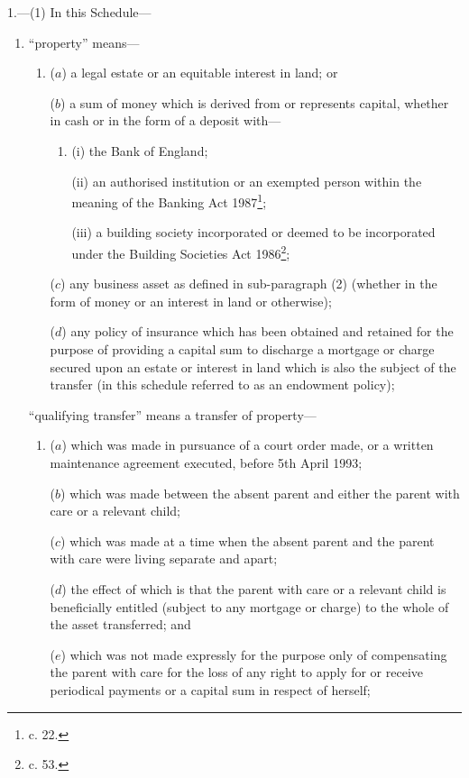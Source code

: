 \documentclass[12pt,a4paper]{article}
\begin{document}
1.—(1) In this Schedule—
\begin{enumerate}\item[]
“property” means—
\begin{enumerate}\item[]
($a$) a legal estate or an equitable interest in land; or

($b$) a sum of money which is derived from or represents capital, whether in cash or in the form of a deposit with—
\begin{enumerate}\item[]
(i) the Bank of England;

(ii) an authorised institution or an exempted person within the meaning of the Banking Act 1987\footnote{ c. 22.};

(iii) a building society incorporated or deemed to be incorporated under the Building Societies Act 1986\footnote{ c. 53.};
\end{enumerate}

\begin{sloppypar}
($c$) any business asset as defined in sub-paragraph (2) (whether in the form of money or an interest in land or otherwise);
\end{sloppypar}

($d$) any policy of insurance which has been obtained and retained for the purpose of providing a capital sum to discharge a mortgage or charge secured upon an estate or interest in land which is also the subject of the transfer (in this schedule referred to as an endowment policy);
\end{enumerate}

“qualifying transfer” means a transfer of property—
\begin{enumerate}\item[]
($a$) which was made in pursuance of a court order made, or a written maintenance agreement executed, before 5th April 1993;

($b$) which was made between the absent parent and either the parent with care or a relevant child;

($c$) which was made at a time when the absent parent and the parent with care were living separate and apart;

($d$) the effect of which is that the parent with care or a relevant child is beneficially entitled (subject to any mortgage or charge) to the whole of the asset transferred; and 

($e$) which was not made expressly for the purpose only of compensating the parent with care for the loss of any right to apply for or receive periodical payments or a capital sum in respect of herself;
\end{enumerate}


\end{enumerate}
\end{document}
